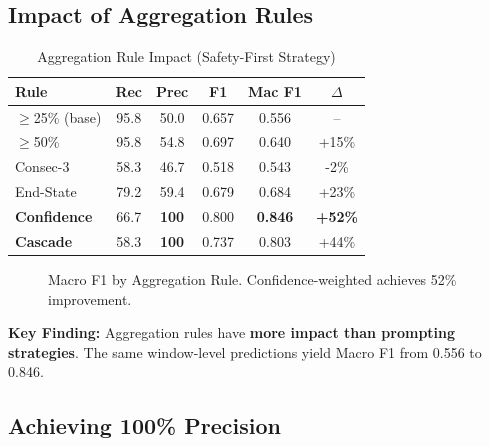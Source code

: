 \documentclass[conference]{IEEEtran}
\begin{document}
\subsection{Impact of Aggregation Rules}

\begin{table}[!t]
\centering
\caption{Aggregation Rule Impact (Safety-First Strategy)}
\label{tab:aggregation}
\begin{tabular}{lccccc}
\toprule
\textbf{Rule} & \textbf{Rec} & \textbf{Prec} & \textbf{F1} & \textbf{Mac F1} & $\Delta$ \\
\midrule
$\geq$25\% (base) & 95.8 & 50.0 & 0.657 & 0.556 & -- \\
$\geq$50\% & 95.8 & 54.8 & 0.697 & 0.640 & +15\% \\
Consec-3 & 58.3 & 46.7 & 0.518 & 0.543 & -2\% \\
End-State & 79.2 & 59.4 & 0.679 & 0.684 & +23\% \\
\textbf{Confidence} & 66.7 & \textbf{100} & 0.800 & \textbf{0.846} & \textbf{+52\%} \\
\textbf{Cascade} & 58.3 & \textbf{100} & 0.737 & 0.803 & +44\% \\
\bottomrule
\end{tabular}
\end{table}

\begin{figure}[!t]
\centering
{}
\caption{Macro F1 by Aggregation Rule. Confidence-weighted achieves 52\% improvement.}
\label{fig:aggregation_impact}
\end{figure}

\textbf{Key Finding:} Aggregation rules have \textbf{more impact than prompting strategies}. The same window-level predictions yield Macro F1 from 0.556 to 0.846.

\subsection{Achieving 100\% Precision}
\end{document}
